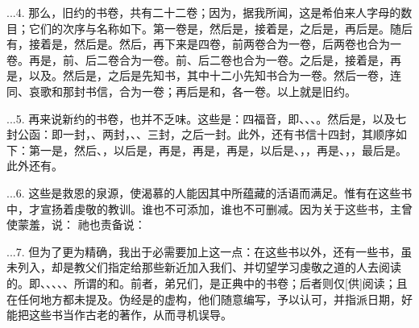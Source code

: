 ...4. 那么，旧约的书卷，共有二十二卷；因为，据我所闻，这是希伯来人字母的数目；它们的次序与名称如下。第一卷是，然后是，接着是，之后是，再后是。随后有，接着是，然后是。然后，再下来是四卷，前两卷合为一卷，后两卷也合为一卷。再是，前、后二卷合为一卷。前、后二卷也合为一卷。之后是，接着是，再是，以及。然后是，之后是先知书，其中十二小先知书合为一卷。然后一卷，连同、哀歌和那封书信，合为一卷；再后是和，各一卷。以上就是旧约。\par

...5. 再来说新约的书卷，也并不乏味。这些是：四福音，即、、、。然后是，以及七封公函：即一封，、两封，、、三封，之后一封。此外，还有书信十四封，其顺序如下：第一是，然后、，以后是，再是，再是，再是，以后是、，，再是、，，最后是。此外还有。\par

...6. 这些是救恩的泉源，使渴慕的人能因其中所蕴藏的活语而满足。惟有在这些书中，才宣扬着虔敬的教训。谁也不可添加，谁也不可删减。因为关于这些书，主曾使蒙羞，说： 祂也责备说： \par

...7. 但为了更为精确，我出于必需要加上这一点：在这些书以外，还有一些书，虽未列入，却是教父们指定给那些新近加入我们、并切望学习虔敬之道的人去阅读的。即、、、、、所谓的和。前者，弟兄们，是正典中的书卷；后者则仅[供]阅读；且在任何地方都未提及。伪经是的虚构，他们随意编写，予以认可，并指派日期，好能把这些书当作古老的著作，从而寻机误导。\par

